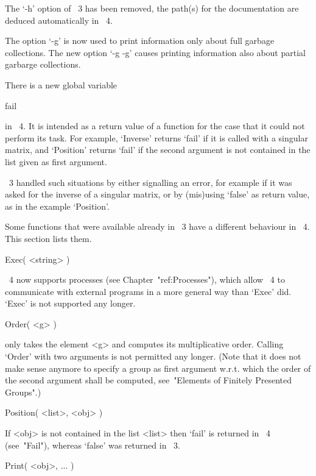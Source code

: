 The `-h' option of {\GAP}~3 has been removed,
the path(s) for the documentation are deduced automatically in {\GAP}~4.

The option `-g' is now used to print information only about full garbage
collections.
The new option `-g -g' causes printing information also about partial
garbarge collections.



There is a new global variable

\)fail


in {\GAP}~4.
It is intended as a return value of a function for the case that it
could not perform its task.
For example, `Inverse' returns `fail' if it is called with a singular
matrix, and `Position' returns `fail' if the second argument is not
contained in the list given as first argument.

{\GAP}~3 handled such situations by either signalling an error,
for example if it was asked for the inverse of a singular matrix,
or by (mis)using `false' as return value, as in the example `Position'.



Some functions that were available already in {\GAP}~3 have a different
behaviour in {\GAP}~4.  This section lists them.

\>Exec( <string> )

{\GAP}~4 now supports processes (see Chapter~"ref:Processes"),
which allow {\GAP}~4 to communicate with external programs in a more
general way than `Exec' did.
`Exec' is not supported any longer.

\>Order( <g> )

only takes the element <g> and computes its multiplicative order.
Calling `Order' with two arguments is not permitted any longer.
(Note that it does not make sense anymore to specify a group as
first argument w.r.t. which the order of the second argument shall
be computed, see~"Elements of Finitely Presented Groups".)

\>Position( <list>, <obj> )

If <obj> is not contained in the list <list> then `fail' is returned
in {\GAP}~4 (see~"Fail"), whereas `false' was returned in {\GAP}~3.

\>Print( <obj>, ... )

